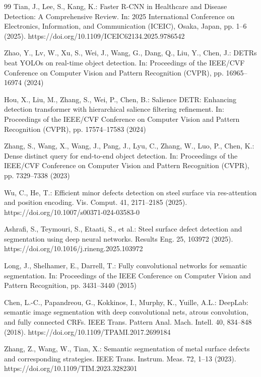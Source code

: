 \documentclass[sn-basic]{sn-jnl}
\theoremstyle{thmstyleone}%
\theoremstyle{thmstyletwo}%
\theoremstyle{thmstylethree}%
\begin{document}
\begin{thebibliography}{99}
 Tian, J., Lee, S., Kang, K.: Faster R-CNN in Healthcare and Disease Detection: A Comprehensive Review. In: 2025 International Conference on Electronics, Information, and Communication (ICEIC), Osaka, Japan, pp. 1–6 (2025). https://doi.org/10.1109/ICEIC62134.2025.9786542

 Zhao, Y., Lv, W., Xu, S., Wei, J., Wang, G., Dang, Q., Liu, Y., Chen, J.: DETRs beat YOLOs on real-time object detection. In: Proceedings of the IEEE/CVF Conference on Computer Vision and Pattern Recognition (CVPR), pp. 16965–16974 (2024)

 Hou, X., Liu, M., Zhang, S., Wei, P., Chen, B.: Salience DETR: Enhancing detection transformer with hierarchical salience filtering refinement. In: Proceedings of the IEEE/CVF Conference on Computer Vision and Pattern Recognition (CVPR), pp. 17574–17583 (2024)

 Zhang, S., Wang, X., Wang, J., Pang, J., Lyu, C., Zhang, W., Luo, P., Chen, K.: Dense distinct query for end-to-end object detection. In: Proceedings of the IEEE/CVF Conference on Computer Vision and Pattern Recognition (CVPR), pp. 7329–7338 (2023)

 Wu, C., He, T.: Efficient minor defects detection on steel surface via res-attention and position encoding. Vis. Comput. 41, 2171–2185 (2025). https://doi.org/10.1007/s00371-024-03583-0

 Ashrafi, S., Teymouri, S., Etaati, S., et al.: Steel surface defect detection and segmentation using deep neural networks. Results Eng. 25, 103972 (2025). https://doi.org/10.1016/j.rineng.2025.103972

 Long, J., Shelhamer, E., Darrell, T.: Fully convolutional networks for semantic segmentation. In: Proceedings of the IEEE Conference on Computer Vision and Pattern Recognition, pp. 3431–3440 (2015)

 Chen, L.-C., Papandreou, G., Kokkinos, I., Murphy, K., Yuille, A.L.: DeepLab: semantic image segmentation with deep convolutional nets, atrous convolution, and fully connected CRFs. IEEE Trans. Pattern Anal. Mach. Intell. 40, 834–848 (2018). https://doi.org/10.1109/TPAMI.2017.2699184

 Zhang, Z., Wang, W., Tian, X.: Semantic segmentation of metal surface defects and corresponding strategies. IEEE Trans. Instrum. Meas. 72, 1–13 (2023). https://doi.org/10.1109/TIM.2023.3282301


\end{thebibliography}
\end{document}
